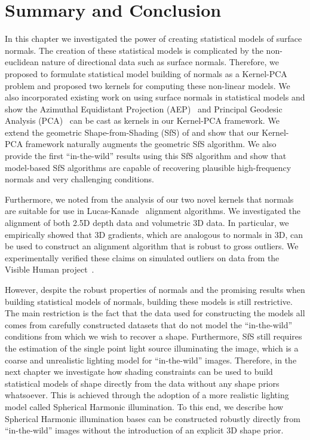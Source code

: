 \section{Summary and Conclusion}\label{sec:singl_img_summary}
In this chapter we investigated the power of creating statistical models
of surface normals. The creation of these statistical models is complicated
by the non-euclidean nature of directional data such as surface normals.
Therefore, we proposed to formulate statistical model building of normals
as a Kernel-PCA problem and proposed two kernels for computing these non-linear
models. We also incorporated existing work on using surface normals in 
statistical models and show the 
Azimuthal Equidistant Projection (AEP)~\cite{smith2006recovering} and
Principal Geodesic Analysis (PCA)~\cite{smith2008facial} can be cast as 
kernels in our Kernel-PCA framework. We extend the geometric 
Shape-from-Shading (SfS) of \citet{smith2006recovering} and show that our 
Kernel-PCA framework naturally augments the geometric SfS algorithm. We also
provide the first ``in-the-wild'' results using this SfS algorithm and show
that model-based SfS algorithms are capable of recovering plausible high-frequency
normals and very challenging conditions.

Furthermore, we noted from the analysis of our two novel kernels that normals
are suitable for use in Lucas-Kanade~\cite{lucas1981iterative} alignment
algorithms. We investigated the alignment of both 2.5D depth data and volumetric
3D data. In particular, we empirically showed that 3D gradients, which are
analogous to normals in 3D, can be used to construct an alignment algorithm
that is robust to gross outliers. We experimentally verified these claims
on simulated outliers on data from the 
Visible Human project~\cite{spitzer1996visiblehuman}.

However, despite the robust properties of normals and the promising results
when building statistical models of normals, building these models is still
restrictive. The main restriction is the fact that the data used
for constructing the models all comes from carefully constructed datasets
that do not model the ``in-the-wild'' conditions from which we wish to recover 
a shape. Furthermore, SfS still requires the estimation of the single point light 
source illuminating the image, which is a coarse and unrealistic lighting
model for ``in-the-wild'' images. Therefore, in the next chapter we investigate
how shading constraints can be used to build statistical models of shape
directly from the data without any shape priors whatsoever. This is achieved
through the adoption of a more realistic lighting model called Spherical
Harmonic illumination. To this end, we describe how Spherical Harmonic illumination
bases can be constructed robustly directly from ``in-the-wild'' images
without the introduction of an explicit 3D shape prior.